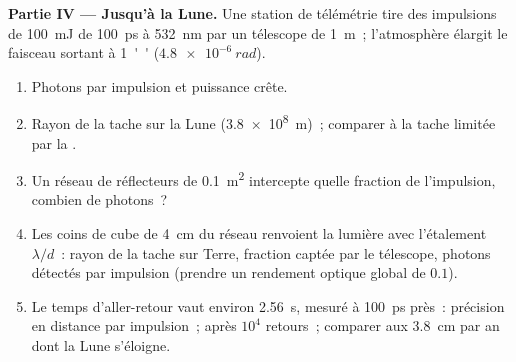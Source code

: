 \begin{problem}
\textbf{Partie IV --- Jusqu'à la Lune.}
Une station de télémétrie tire des impulsions de \qty{100}{mJ} de \qty{100}{ps} à
\qty{532}{nm} par un télescope de \qty{1}{m}~; l'atmosphère élargit
le faisceau sortant à \qty{1}{''} ($\qty{4.8e-6}{rad}$).
\begin{enumerate}[resume]
  \item Photons par impulsion et puissance crête.
  \item Rayon de la tache sur la Lune (\qty{3.8e8}{m})~; comparer à la
        tache limitée par la .
  \item Un réseau de réflecteurs de \qty{0.1}{m^2} intercepte quelle fraction de
        l'impulsion, combien de photons~?
  \item Les coins de cube de \qty{4}{cm} du réseau renvoient la lumière avec
        l'étalement $\lambda/d$~: rayon de la tache sur Terre, fraction captée par le
        télescope, photons détectés par impulsion (prendre un rendement optique
        global de $0.1$).
  \item Le temps d'aller-retour vaut environ \qty{2.56}{s}, mesuré à
        \qty{100}{ps} près~: précision en distance par impulsion~; après $10^4$
        retours~; comparer aux \qty{3.8}{cm} par an dont la
        Lune s'éloigne.
\end{enumerate}
\end{problem}
